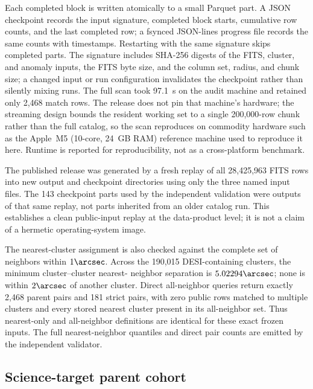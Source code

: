 \documentclass[twocolumn,linenumbers]{aastex702}
\begin{document}
Each completed block is written atomically to a small Parquet part.  A JSON checkpoint records
the input signature, completed block starts, cumulative row counts, and the last completed row;
a fsynced JSON-lines progress file records the same counts with timestamps.  Restarting with the
same signature skips completed parts.  The signature includes SHA-256 digests of the FITS, cluster,
and anomaly inputs, the FITS byte size, and the column set, radius, and chunk size; a changed
input or run configuration invalidates the checkpoint rather than silently mixing runs.  The full scan took
97.1~s on the audit machine and retained only 2,468 match rows.  The release does not pin that
machine's hardware; the streaming design bounds the resident working set to a single 200,000-row
chunk rather than the full catalog, so the scan reproduces on commodity hardware such as the
Apple~M5 (10-core, 24~GB RAM) reference machine used to reproduce it here.  Runtime is reported for
reproducibility, not as a cross-platform benchmark.

The published release was generated by a fresh replay of all 28,425,963 FITS rows into new output
and checkpoint directories using only the three named input files.  The 143 checkpoint parts used
by the independent validation were outputs of that same replay, not parts inherited from an older
catalog run.  This establishes a clean public-input replay at the data-product level; it is not a
claim of a hermetic operating-system image.

The nearest-cluster assignment is also checked against the complete set of neighbors within
$1\arcsec$.  Across the 190,015 DESI-containing clusters, the minimum cluster--cluster nearest-
neighbor separation is $5.02294\arcsec$; none is within $2\arcsec$ of another cluster.  Direct
all-neighbor queries return exactly 2,468 parent pairs and 181 strict pairs, with zero public rows
matched to multiple clusters and every stored nearest cluster present in its all-neighbor set.
Thus nearest-only and all-neighbor definitions are identical for these exact frozen inputs.  The
full nearest-neighbor quantiles and direct pair counts are emitted by the independent validator.

\subsection{Science-target parent cohort}\label{sec:parent-selection}
\end{document}
